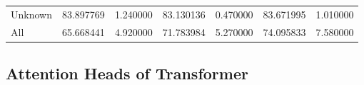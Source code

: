 \begin{table}[!ht]
\begin{tabular}{lSSSSSS@{}}
        \tabindent Unknown          & 83.897769                                        & 1.240000                                              & 83.130136                                     & 0.470000  & 83.671995    & 1.010000  \\
        \cmidrule(rl){1-7}
 All              & 65.668441                                        & 4.920000                                              & 71.783984                                     & 5.270000  & 74.095833    & 7.580000  \\
        \bottomrule
    \end{tabular}
\end{table}

\newpage
\subsection{Attention Heads of Transformer}
\label{app:attention-heads-of-transformer}

